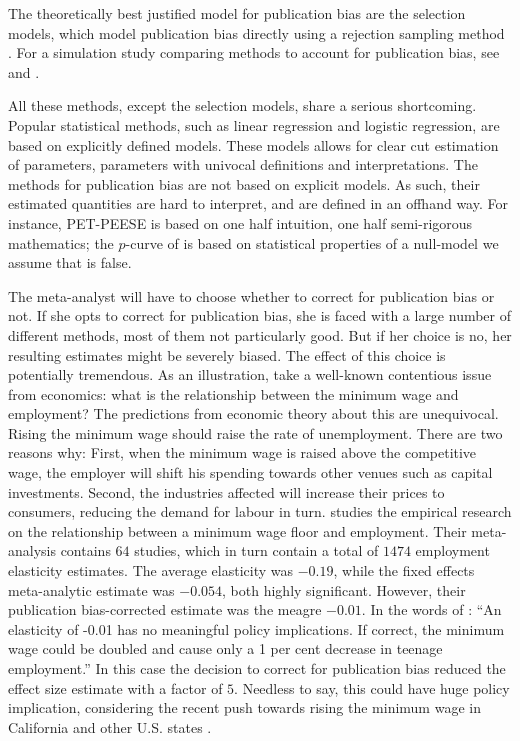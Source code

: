 The theoretically best justified model for publication bias are the selection models, which model publication bias directly using a rejection sampling method \textcite{Hedges1992-ue}. For a simulation study comparing methods to account for publication bias, see \textcite{moreno_assessment_2009} and \textcite{Carter2019-rw}.

All these methods, except the selection models, share a serious shortcoming. Popular statistical methods, such as linear regression and logistic regression, are based on explicitly defined models. These models allows for clear cut estimation of parameters, parameters with univocal definitions and interpretations. The methods for publication bias are not based on explicit models. As such, their estimated quantities are hard to interpret, and are defined in an offhand way. For instance, PET-PEESE is based on one half intuition, one half semi-rigorous mathematics; the $p$-curve of is based on statistical properties of a null-model we assume that is false. 

The meta-analyst will have to choose whether to correct for publication bias or not. If she opts to correct for publication bias, she is faced with a large number of different methods, most of them not particularly good. But if her choice is no, her resulting estimates might be severely biased. The effect of this choice is potentially tremendous. As an illustration, take a well-known contentious issue from economics: what is the relationship between the minimum wage and employment? The predictions from economic theory about this are unequivocal. Rising the minimum wage should raise the rate of unemployment. There are two reasons why: First, when the minimum wage is raised above the competitive wage, the employer will shift his spending towards other venues such as capital investments. Second, the industries affected will increase their prices to consumers, reducing the demand for labour in turn. \textcite{doucouliagos_publication_2009} studies the empirical research on the relationship between a minimum wage floor and employment. Their meta-analysis contains $64$ studies, which in turn contain a total of $1474$ employment elasticity estimates. The average elasticity was $-0.19$, while the fixed effects meta-analytic estimate was $-0.054$, both highly significant. However, their publication bias-corrected estimate was the meagre $-0.01$. In the words of \textcite{doucouliagos_publication_2009}: ``An elasticity of -0.01 has no meaningful policy implications. If correct, the minimum wage could be doubled and cause only a 1 per cent decrease in teenage employment.'' In this case the decision to correct for publication bias reduced the effect size estimate with a factor of $5$. Needless to say, this could have huge policy implication, considering the recent push towards rising the minimum wage in California and other U.S. states \parencite{Lee2016-bd}.

